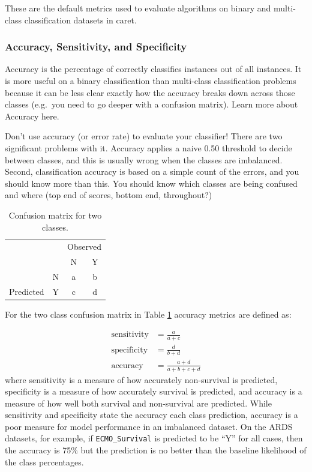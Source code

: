 \documentclass[12pt,]{article}
\begin{document}
These are the default metrics used to evaluate algorithms on binary and
multi-class classification datasets in caret.

\subsubsection{Accuracy, Sensitivity, and
Specificity}\label{accuracy-sensitivity-and-specificity}

Accuracy is the percentage of correctly classifies instances out of all
instances. It is more useful on a binary classification than multi-class
classification problems because it can be less clear exactly how the
accuracy breaks down across those classes (e.g.~you need to go deeper
with a confusion matrix). Learn more about Accuracy here.

Don't use accuracy (or error rate) to evaluate your classifier! There
are two significant problems with it. Accuracy applies a naive 0.50
threshold to decide between classes, and this is usually wrong when the
classes are imbalanced. Second, classification accuracy is based on a
simple count of the errors, and you should know more than this. You
should know which classes are being confused and where (top end of
scores, bottom end, throughout?)

\begin{table}[!h]

\caption{\label{tab:confusion-matrix}\label{tab:confusion-matrix} Confusion matrix for two classes.}
\centering
\fontsize{12}{14}\selectfont
\begin{tabular}{lc|cc}
\toprule
\multicolumn{2}{c}{ } & \multicolumn{2}{c}{Observed} \\
\cmidrule(l{3pt}r{3pt}){3-4}
  &   & N & Y\\
\midrule
\rowcolor{gray!6}   & N & a & b\\

\multirow{-2}{*}{\raggedright\arraybackslash Predicted} & Y & c & d\\
\bottomrule
\end{tabular}
\end{table}

For the two class confusion matrix in Table \ref{tab:confusion-matrix}
accuracy metrics are defined as:

\[
\begin{aligned}
\text{sensitivity} &= \frac{a}{a+c} \\
\text{specificity} &= \frac{d}{b+d} \\
\text{accuracy} &= \frac{a+d}{a+b+c+d}
\end{aligned}
\] where sensitivity is a measure of how accurately non-survival is
predicted, specificity is a measure of how accurately survival is
predicted, and accuracy is a measure of how well both survival and
non-survival are predicted. While sensitivity and specificity state the
accuracy each class prediction, accuracy is a poor measure for model
performance in an imbalanced dataset. On the ARDS datasets, for example,
if \texttt{ECMO\_Survival} is predicted to be ``Y'' for all cases, then
the accuracy is 75\% but the prediction is no better than the baseline
likelihood of the class percentages.
\end{document}
